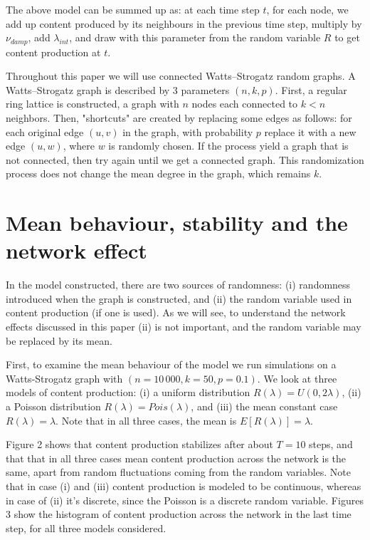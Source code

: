 \documentclass[final,5p,times,twocolumn,authoryear]{elsarticle}
\begin{document}
The above model can be summed up as: at each time step $t$, for each node, we add up content produced by its neighbours in the previous time step, multiply by $\nu_{damp} $, add $\lambda_{int}$, and draw with this parameter from the random variable $R$ to get content production at $t$.

Throughout this paper we will use connected Watts–Strogatz random graphs. A Watts–Strogatz graph is described by 3 parameters $(n, k, p)$. First, a regular ring lattice is constructed, a graph with $n$ nodes each connected to $k < n$ neighbors. Then, "shortcuts" are created by replacing some edges as follows: for each original edge $(u, v)$ in the graph, with probability $p$ replace it with a new edge $(u, w)$, where $w$ is randomly chosen. If the process yield a graph that is not connected, then try again until we get a connected graph. This randomization process does not change the mean degree in the graph, which remains $k$.

\section{Mean behaviour, stability and the network effect}

In the model constructed, there are two sources of randomness: (i) randomness introduced when the graph is constructed, and (ii) the random variable used in content production (if one is used). As we will see, to understand the network effects discussed in this paper (ii) is not important, and the random variable may be replaced by its mean.

First, to examine the mean behaviour of the model we run simulations on a Watts-Strogatz graph with $(n=10\,000, k=50, p=0.1)$. We look at three models of content production: (i) a uniform distribution $R(\lambda)=U(0, 2 \lambda)$, (ii) a Poisson distribution $R(\lambda)=Pois(\lambda)$, and (iii) the mean constant case $R(\lambda)=\lambda$. Note that in all three cases, the mean is $E[R(\lambda)]=\lambda$.

Figure 2 shows that content production stabilizes after about $T=10$ steps, and that that in all three cases mean content production across the network is the same, apart from random fluctuations coming from the random variables. Note that in case (i) and (iii) content production is modeled to be continuous, whereas in case of (ii) it's discrete, since the Poisson is a discrete random variable. Figures 3 show the histogram of content production across the network in the last time step, for all three models considered.
\end{document}
